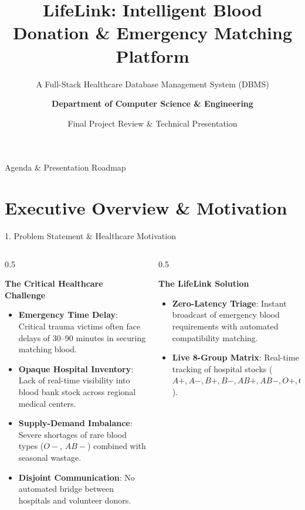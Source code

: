 \documentclass[aspectratio=169,10pt]{beamer}
\title[\textbf{LifeLink Platform}]{\textbf{LifeLink: Intelligent Blood Donation \& Emergency Matching Platform}}
\subtitle{A Full-Stack Healthcare Database Management System (DBMS)}
\author[Project Presentation]{\textbf{Department of Computer Science \& Engineering}}
\institute[LifeLink Health Stack]{Database Management Systems (DBMS) Laboratory \\ Full-Stack HealthTech Infrastructure}
\date[\today]{Final Project Review \& Technical Presentation}
\begin{document}
\begin{frame}
    \titlepage
\end{frame}

\begin{frame}{Agenda \& Presentation Roadmap}
    \tableofcontents
\end{frame}

\section{Executive Overview \& Motivation}

\begin{frame}{1. Problem Statement \& Healthcare Motivation}
    \begin{columns}[T]
        \begin{column}{0.5\textwidth}
            \begin{block}{\textbf{The Critical Healthcare Challenge}}
                \begin{itemize}
                    \item \textbf{Emergency Time Delay}: Critical trauma victims often face delays of 30--90 minutes in securing matching blood.
                    \item \textbf{Opaque Hospital Inventory}: Lack of real-time visibility into blood bank stock across regional medical centers.
                    \item \textbf{Supply-Demand Imbalance}: Severe shortages of rare blood types ($O-$, $AB-$) combined with seasonal wastage.
                    \item \textbf{Disjoint Communication}: No automated bridge between hospitals and volunteer donors.
                \end{itemize}
            \end{block}
        \end{column}
        \begin{column}{0.5\textwidth}
            \begin{alertblock}{\textbf{The LifeLink Solution}}
                \begin{itemize}
                    \item \textbf{Zero-Latency Triage}: Instant broadcast of emergency blood requirements with automated compatibility matching.
                    \item \textbf{Live 8-Group Matrix}: Real-time tracking of hospital stocks ($A+, A-, B+, B-, AB+, AB-, O+, O-$).

\end{itemize}
\end{alertblock}
\end{column}
\end{columns}
\end{frame}
\end{document}
